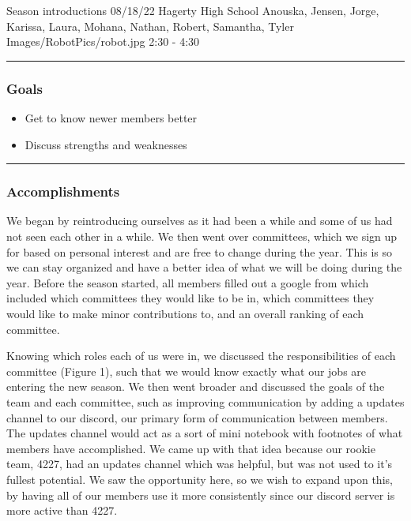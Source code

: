 \insertmeeting
	{Season introductions} 
	{08/18/22} 
	{Hagerty High School}
	{Anouska, Jensen, Jorge, Karissa, Laura, Mohana, Nathan, Robert, Samantha, Tyler}
	{Images/RobotPics/robot.jpg}
	{2:30 - 4:30}

 
\noindent\hfil\rule{\textwidth}{.4pt}\hfil
\subsubsection*{Goals}
\begin{itemize}
    \item Get to know newer members better
    \item Discuss strengths and weaknesses

\end{itemize} 

\noindent\hfil\rule{\textwidth}{.4pt}\hfil

\subsubsection*{Accomplishments}
We began by reintroducing ourselves as it had been a while and some of us had not seen each other in a while. We then went over committees, which we sign up for based on personal interest and are free to change during the year. This is so we can stay organized and have a better idea of what we will be doing during the year. Before the season started, all members filled out a google from which included which committees they would like to be in, which committees they would like to make minor contributions to, and an overall ranking of each committee. 

Knowing which roles each of us were in, we discussed the responsibilities of each committee (Figure 1), such that we would know exactly what our jobs are entering the new season. We then went broader and discussed the goals of the team and each committee, such as improving communication by adding a updates channel to our discord, our primary form of communication between members. The updates channel would act as a sort of mini notebook with footnotes of what members have accomplished. We came up with that idea because our rookie team, 4227, had an updates channel which was helpful, but was not used to it's fullest potential. We saw the opportunity here, so we wish to expand upon this, by having all of our members use it more consistently since our discord server is more active than 4227.

